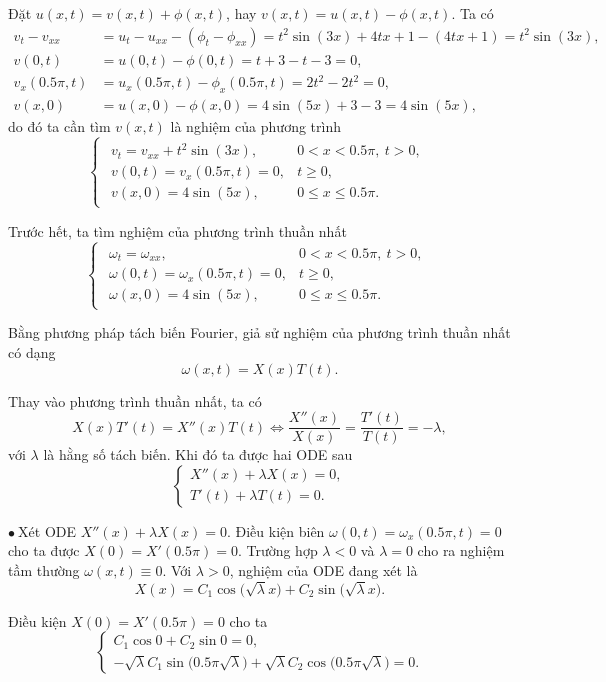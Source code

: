 \documentclass[10pt, a4paper]{article}
\begin{document}
	Đặt $u(x,t)=v(x,t)+\phi(x,t)$, hay $v(x,t)=u(x,t)-\phi(x,t)$. Ta có \begin{align*}
		v_{t}-v_{xx}&=u_{t}-u_{xx}-\left(\phi_{t}-\phi_{xx}\right)=t^2\sin(3x)+4tx+1-(4tx+1)=t^2\sin(3x),\\
		v(0,t)&=u(0,t)-\phi(0,t)=t+3-t-3=0,\\
		v_x(0.5\pi,t)&=u_x(0.5\pi,t)-\phi_x(0.5\pi,t)=2t^2-2t^2=0,\\
		v(x,0)&=u(x,0)-\phi(x,0)=4\sin(5x)+3-3=4\sin(5x),
	\end{align*}
	do đó ta cần tìm $v(x,t)$ là nghiệm của phương trình $$\begin{cases}
		\begin{array}{ll}
			v_t=v_{xx}+t^2\sin(3x), & 0<x<0.5\pi,~t>0,\\
			v(0,t)=v_x(0.5\pi,t)=0, & t\ge0,\\
			v(x,0)=4\sin(5x), & 0\le x\le 0.5\pi.
		\end{array}
	\end{cases}$$
	
	Trước hết, ta tìm nghiệm của phương trình thuần nhất $$\begin{cases}
		\begin{array}{ll}
			\omega_t=\omega_{xx}, & 0<x<0.5\pi,~t>0,\\
			\omega(0,t)=\omega_x(0.5\pi,t)=0, & t\ge0,\\
			\omega(x,0)=4\sin(5x), & 0\le x\le 0.5\pi.
		\end{array}
	\end{cases}$$
	
	Bằng phương pháp tách biến Fourier, giả sử nghiệm của phương trình thuần nhất có dạng $$\omega(x,t)=X(x)T(t).$$
	
	Thay vào phương trình thuần nhất, ta có $$X(x)T'(t)=X''(x)T(t)\iff\frac{X''(x)}{X(x)}=\frac{T'(t)}{T(t)}=-\lambda,$$
	với $\lambda$ là hằng số tách biến. Khi đó ta được hai ODE sau $$\begin{cases}
		X''(x)+\lambda X(x)=0,\\
		T'(t)+\lambda T(t)=0.
	\end{cases}$$
	
	$\bullet~$Xét ODE $X''(x)+\lambda X(x)=0$. Điều kiện biên $\omega(0,t)=\omega_x(0.5\pi,t)=0$ cho ta được $X(0)=X'(0.5\pi)=0$. Trường hợp $\lambda<0$ và $\lambda=0$ cho ra nghiệm tầm thường $\omega(x,t)\equiv0$. Với $\lambda>0$, nghiệm của ODE đang xét là $$X(x)=C_1\cos\big(\sqrt\lambda x\big)+C_2\sin\big(\sqrt\lambda x\big).$$
	
	Điều kiện $X(0)=X'(0.5\pi)=0$ cho ta $$\begin{cases}
		C_1\cos0+C_2\sin0=0,\\
		-\sqrt\lambda C_1\sin\big(0.5\pi\sqrt\lambda\big)+\sqrt\lambda C_2\cos\big(0.5\pi\sqrt\lambda\big)=0.
	\end{cases}$$
	
\end{document}
